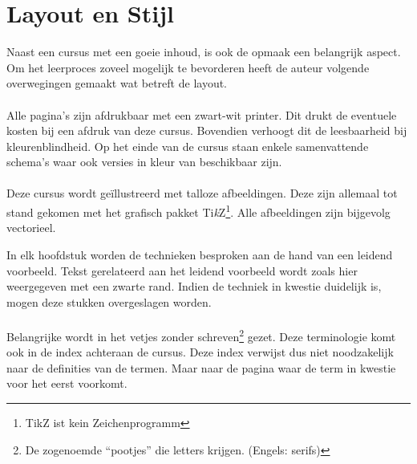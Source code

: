 \section*{Layout en Stijl}
Naast een cursus met een goeie inhoud, is ook de opmaak een belangrijk aspect. Om het leerproces zoveel mogelijk te bevorderen heeft de auteur volgende overwegingen gemaakt wat betreft de layout.
\paragraph{}
Alle pagina's zijn afdrukbaar met een zwart-wit printer. Dit drukt de eventuele kosten bij een afdruk van deze cursus. Bovendien verhoogt dit de leesbaarheid bij kleurenblindheid. Op het einde van de cursus staan enkele samenvattende schema's waar ook versies in kleur van beschikbaar zijn.
\paragraph{}
Deze cursus wordt ge\"illustreerd met talloze afbeeldingen. Deze zijn allemaal tot stand gekomen met het grafisch pakket Ti\textit{k}Z\footnote{TikZ ist kein Zeichenprogramm}. Alle afbeeldingen zijn bijgevolg vectorieel.
\begin{leftbar}
In elk hoofdstuk worden de technieken besproken aan de hand van een leidend voorbeeld. Tekst gerelateerd aan het leidend voorbeeld wordt zoals hier weergegeven met een zwarte rand. Indien de techniek in kwestie duidelijk is, mogen deze stukken overgeslagen worden.
\end{leftbar}
\paragraph{}
Belangrijke  wordt in het vetjes zonder schreven\footnote{De zogenoemde ``pootjes'' die letters krijgen. (Engels: serifs)} gezet. Deze terminologie komt ook in de index achteraan de cursus. Deze index verwijst dus niet noodzakelijk naar de definities van de termen. Maar naar de pagina waar de term in kwestie voor het eerst voorkomt.
\begin{figure}[H]
\centering
{}
\end{figure}
